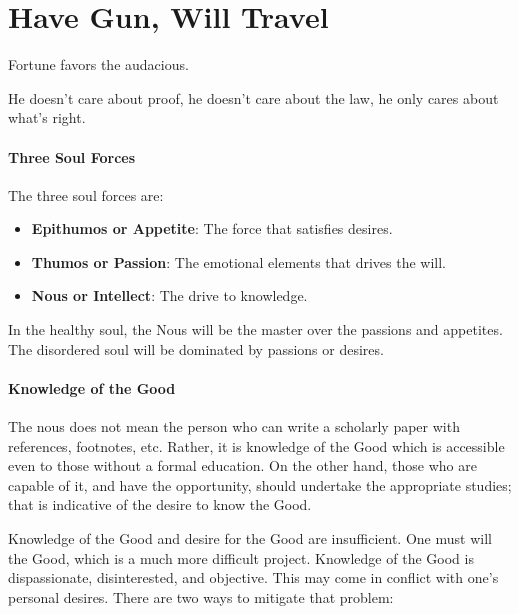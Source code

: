 \section{Have Gun, Will Travel}

\begin{quotex}
Fortune favors the audacious.

He doesn't care about proof, he doesn't care about the law, he only cares about what's right.
\end{quotex}


\paragraph{Three Soul Forces}


The three soul forces are:

\begin{itemize}


\item \textbf{Epithumos or Appetite}: The force that satisfies desires.


\item \textbf{Thumos or Passion}: The emotional elements that drives the will.

\item \textbf{Nous or Intellect}: The drive to knowledge.

\end{itemize}


In the healthy soul, the Nous will be the master over the passions and appetites. The disordered soul will be dominated by passions or desires.

\paragraph{Knowledge of the Good}


The nous does not mean the person who can write a scholarly paper with references, footnotes, etc. Rather, it is knowledge of the Good which is accessible even to those without a formal education. On the other hand, those who are capable of it, and have the opportunity, should undertake the appropriate studies; that is indicative of the desire to know the Good.

Knowledge of the Good and desire for the Good are insufficient. One must will the Good, which is a much more difficult project. Knowledge of the Good is dispassionate, disinterested, and objective. This may come in conflict with one's personal desires. There are two ways to mitigate that problem:


